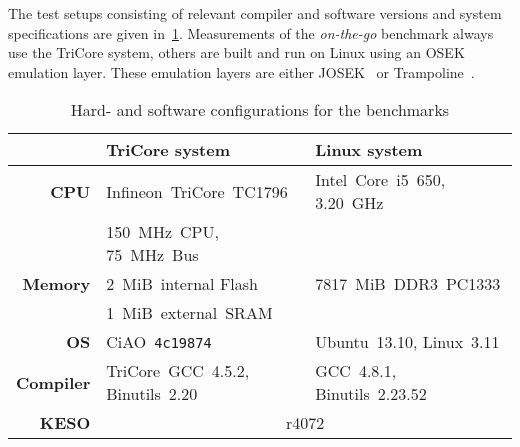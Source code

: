 	The test setups consisting of relevant compiler and software versions and system specifications are given
	in~\cref{tbl:eval:setup}. Measurements of the \emph{on-the-go} benchmark always use the TriCore system, others are
	built and run on Linux using an OSEK emulation layer. These emulation layers are either JOSEK~\cite{josek:10} or
	Trampoline~\cite{bechennec:06:etfa}.

	\begin{table}
		\centering
		\begin{tabular}{rll}
				& \textbf{TriCore system} & \textbf{Linux system}\\\hline\hline
			\multirow{1}{*}{\textbf{CPU}} &
				  Infineon~TriCore~TC1796 & Intel~Core~i5~650, 3.20~GHz\\
				& 150~MHz~CPU, 75~MHz~Bus & \\
			\multirow{1}{*}{\textbf{Memory}} &
				  2~MiB~internal Flash & 7817~MiB~DDR3~PC1333\\
				& 1~MiB~external~SRAM & \\
			\textbf{OS} &
				CiAO~\texttt{4c19874} & Ubuntu~13.10, Linux~3.11\\
			\textbf{Compiler} &
				TriCore~GCC~4.5.2, Binutils~2.20 & GCC~4.8.1, Binutils~2.23.52\\
			\textbf{KESO} &
				\multicolumn{2}{c}{r4072}
		\end{tabular}

		\caption{Hard- and software configurations for the benchmarks}
		\label{tbl:eval:setup}
	\end{table}

